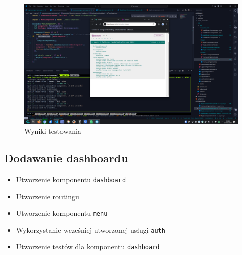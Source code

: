 \documentclass[12pt]{article}
\begin{document}
\begin{figure}[H]
  \centering
  \includegraphics[width=1\textwidth,keepaspectratio]{image-10.png}
  \caption{Wyniki testowania}
  \label{fig:image-10}
\end{figure}

\pagebreak

\subsection{Dodawanie dashboardu}
\begin{itemize}[leftmargin=.5em]
  \item{Utworzenie komponentu \texttt{dashboard}}
  \item{Utworzenie routingu}
  \item{Utworzenie komponentu \texttt{menu}}
  \item{Wykorzystanie wcześniej utworzonej usługi \texttt{auth}}
  \item{Utworzenie testów dla komponentu \texttt{dashboard}}
\end{itemize}
\end{document}
